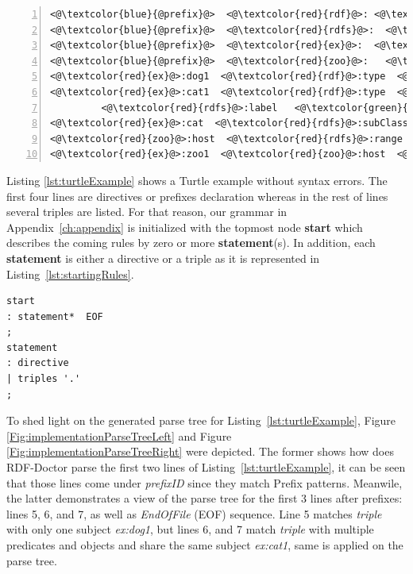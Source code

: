 \begin{lstlisting}[label=lst:turtleExample, numbers=left, caption={RDF example in Turtle serialization format}]
<@\textcolor{blue}{@prefix}@>  <@\textcolor{red}{rdf}@>: <@\textcolor{orange}{<http://www.w3.org/1999/02/22-rdf-syntax-ns\#>}@> .
<@\textcolor{blue}{@prefix}@>  <@\textcolor{red}{rdfs}@>:  <@\textcolor{orange}{<http://www.w3.org/2000/01/rdf-schema\#>}@> .
<@\textcolor{blue}{@prefix}@>  <@\textcolor{red}{ex}@>:  <@\textcolor{orange}{<http://example.org/>}@> .
<@\textcolor{blue}{@prefix}@>  <@\textcolor{red}{zoo}@>:   <@\textcolor{orange}{<http://example.org/zoo/> }@> .
<@\textcolor{red}{ex}@>:dog1  <@\textcolor{red}{rdf}@>:type  <@\textcolor{red}{ex}@>:animal .
<@\textcolor{red}{ex}@>:cat1  <@\textcolor{red}{rdf}@>:type  <@\textcolor{red}{ex}@>:cat ;
         <@\textcolor{red}{rdfs}@>:label   <@\textcolor{green}{"Lusi"@en}@> .
<@\textcolor{red}{ex}@>:cat  <@\textcolor{red}{rdfs}@>:subClassOf  <@\textcolor{red}{ex}@>:animal .
<@\textcolor{red}{zoo}@>:host  <@\textcolor{red}{rdfs}@>:range  <@\textcolor{red}{ex}@>:animal .
<@\textcolor{red}{ex}@>:zoo1  <@\textcolor{red}{zoo}@>:host  <@\textcolor{red}{ex}@>:cat2 .
\end{lstlisting}

Listing \ref{lst:turtleExample} shows a Turtle example without syntax errors. 
The first four lines are directives or prefixes declaration whereas in the rest of lines several triples are listed.  
For that reason, our grammar in Appendix~\ref{ch:appendix} is initialized with the topmost node \textbf{start} which describes the coming rules by zero or more  \textbf{statement}(s). 
In addition, each \textbf{statement} is either a directive or a triple as it is represented in Listing~\ref{lst:startingRules}.

\begin{lstlisting}[label=lst:startingRules,
caption={Starting rules in the grammar file}] 
start
: statement*  EOF
;
statement
: directive
| triples '.'
;
\end{lstlisting}

To shed light on the generated parse tree for Listing~\ref{lst:turtleExample}, Figure \ref{Fig:implementationParseTreeLeft}
and Figure \ref{Fig:implementationParseTreeRight}
were depicted. The former shows how does RDF-Doctor parse the first two lines of  Listing~\ref{lst:turtleExample}, it can be seen that those lines come under \emph{prefixID} since they match Prefix patterns. Meanwile, the latter demonstrates a view of the parse tree for the first 3 lines after prefixes: lines 5, 6, and 7, as well as \emph{EndOfFile} (EOF) sequence. Line 5 matches \emph{triple} with only one subject \emph{ex:dog1}, but lines 6, and 7 match \emph{triple} with multiple predicates and objects and share the same subject \emph{ex:cat1}, same is applied on the parse tree.  





